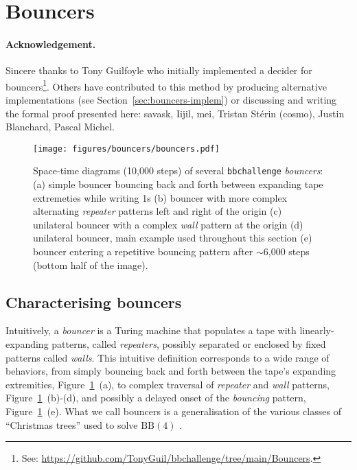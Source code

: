 
\section{Bouncers}\label{sec:bouncers}

\paragraph{Acknowledgement.}  Sincere thanks to Tony Guilfoyle who initially implemented a decider for bouncers\footnote{See: \url{https://github.com/TonyGuil/bbchallenge/tree/main/Bouncers}.}.
Others have contributed to this method by producing alternative implementations (see Section~\ref{sec:bouncers-implem}) or discussing and writing the formal proof presented here: savask, Iijil, mei, Tristan Stérin (cosmo), Justin Blanchard, Pascal Michel.


\begin{figure}[h!]
    \centering
    \texttt{[image: figures/bouncers/bouncers.pdf]}
    \caption{Space-time diagrams (10,000 steps) of several \texttt{bbchallenge} \textit{bouncers}: (a) simple bouncer bouncing back and forth between expanding tape extremeties while writing 1s (b) bouncer with more complex alternating \textit{repeater} patterns left and right of the origin (c) unilateral bouncer with a complex \textit{wall} pattern at the origin (d) unilateral bouncer, main example used throughout this section (e) bouncer entering a repetitive bouncing pattern after $\sim$6,000 steps (bottom half of the image).}\label{fig:bouncers}
\end{figure}

\subsection{Characterising bouncers}

Intuitively, a \emph{bouncer} is a Turing machine that populates a tape with
linearly-expanding patterns, called \textit{repeaters}, possibly separated or enclosed by fixed patterns called \textit{walls}. This intuitive definition corresponds to a wide range of behaviors, from simply bouncing back and forth between the tape's expanding extremities, Figure~\ref{fig:bouncers}~(a), to complex traversal of \textit{repeater} and \textit{wall} patterns, Figure~\ref{fig:bouncers}~(b)-(d), and possibly a delayed onset of the \textit{bouncing} pattern, Figure~\ref{fig:bouncers}~(e). What we call bouncers is a generalisation of the various classes of ``Christmas trees'' used to solve $\text{BB}(4)$ \cite{Brady83}.

